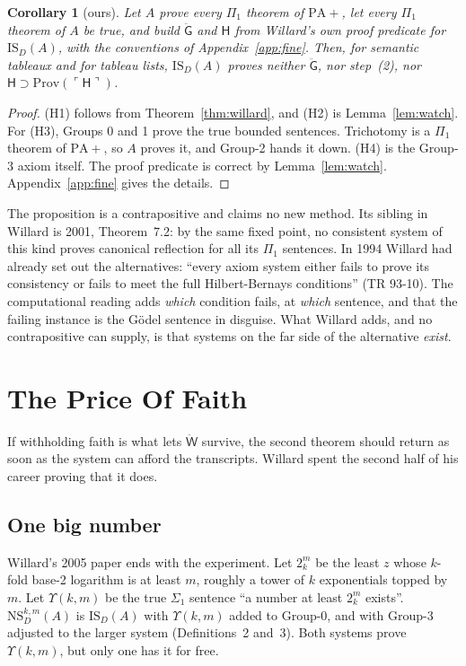 \documentclass[11pt]{article}
\newcommand{\G}{\ddot{\mathsf{G}}}          %
\newcommand{\W}{\ddot{\mathsf{W}}}          %
\newcommand{\Hs}{\mathsf{H}}                %
\newcommand{\Prov}{\mathrm{Prov}}
\newcommand{\gn}[1]{\ulcorner #1\urcorner}  %
\newcommand{\ISD}{\mathrm{IS}_D(A)}
\theoremstyle{plain}
\newtheorem{corollary}[theorem]{Corollary}
\theoremstyle{definition}
\begin{document}
\begin{corollary}[ours]\label{cor:isd}
Let $A$ prove every $\Pi_1$ theorem of $\mathrm{PA}{+}$, let every $\Pi_1$
theorem of $A$ be true, and build $\G$ and $\Hs$ from Willard's own proof
predicate for $\ISD$, with the conventions of Appendix~\ref{app:fine}. Then,
for semantic tableaux and for tableau lists, $\ISD$ proves neither $\G$, nor
step~(2), nor $\Hs \supset \Prov(\gn{\Hs})$.
\end{corollary}

\begin{proof}
(H1) follows from Theorem~\ref{thm:willard}, and (H2) is
Lemma~\ref{lem:watch}. For (H3), Groups 0 and 1 prove the true bounded
sentences. Trichotomy is a $\Pi_1$ theorem of $\mathrm{PA}{+}$, so $A$ proves
it, and Group-2 hands it down. (H4) is the Group-3 axiom itself. The proof
predicate is correct by Lemma~\ref{lem:watch}. Appendix~\ref{app:fine} gives
the details.
\end{proof}

The proposition is a contrapositive and claims no new method. Its sibling in
Willard is 2001, Theorem~7.2: by the same fixed point, no consistent system of
this kind proves canonical reflection for all its $\Pi_1$ sentences. In 1994
Willard had already set out the alternatives: ``every axiom system either
fails to prove its consistency or fails to meet the full Hilbert-Bernays
conditions'' (TR 93-10). The computational reading adds \emph{which}
condition fails, at \emph{which} sentence, and that the failing instance is
the Gödel sentence in disguise. What Willard adds, and no contrapositive can
supply, is that systems on the far side of the alternative \emph{exist}.

\section{The Price Of Faith}
\label{sec:price}

If withholding faith is what lets $\W$ survive, the second theorem should
return as soon as the system can afford the transcripts. Willard spent the
second half of his career proving that it does.

\subsection*{One big number}

Willard's 2005 paper ends with the experiment. Let $2^m_k$ be the least $z$
whose $k$-fold base-2 logarithm is at least $m$, roughly a tower of $k$
exponentials topped by $m$. Let $\Upsilon(k,m)$ be the true $\Sigma_1$
sentence ``a number at least $2^m_k$ exists''. $\mathrm{NS}^{k,m}_D(A)$ is
$\ISD$ with $\Upsilon(k,m)$ added to Group-0, and with Group-3 adjusted to the
larger system (Definitions~2 and~3). Both systems prove $\Upsilon(k,m)$, but
only one has it for free.
\end{document}
